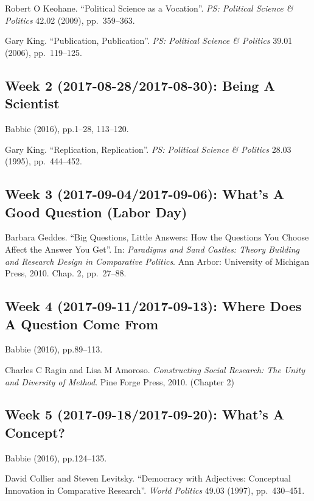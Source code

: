 \documentclass[11pt,]{article}
\theoremstyle{definition}
\theoremstyle{definition}
\theoremstyle{remark}
\begin{document}
Robert O Keohane. ``Political Science as a Vocation''.
\emph{PS: Political Science \& Politics} 42.02 (2009), pp.~359--363.

Gary King. ``Publication, Publication''.
\emph{PS: Political Science \& Politics} 39.01 (2006), pp.~119--125.

\subsection{Week 2 (2017-08-28/2017-08-30): Being A
Scientist}\label{week-2-2017-08-282017-08-30-being-a-scientist}

Babbie (2016), pp.1--28, 113--120.

Gary King. ``Replication, Replication''.
\emph{PS: Political Science \& Politics} 28.03 (1995), pp.~444--452.

\subsection{Week 3 (2017-09-04/2017-09-06): What's A Good Question
(Labor
Day)}\label{week-3-2017-09-042017-09-06-whats-a-good-question-labor-day}

Barbara Geddes. ``Big Questions, Little Answers: How the Questions You
Choose Affect the Answer You Get''. In:
\emph{Paradigms and Sand Castles: Theory Building and Research Design in Comparative Politics}.
Ann Arbor: University of Michigan Press, 2010. Chap. 2, pp.~27--88.

\subsection{Week 4 (2017-09-11/2017-09-13): Where Does A Question Come
From}\label{week-4-2017-09-112017-09-13-where-does-a-question-come-from}

Babbie (2016), pp.89--113.

Charles C Ragin and Lisa M Amoroso.
\emph{Constructing Social Research: The Unity and Diversity of Method}.
Pine Forge Press, 2010. (Chapter 2)

\subsection{Week 5 (2017-09-18/2017-09-20): What's A
Concept?}\label{week-5-2017-09-182017-09-20-whats-a-concept}

Babbie (2016), pp.124--135.

David Collier and Steven Levitsky. ``Democracy with Adjectives:
Conceptual Innovation in Comparative Research''. \emph{World Politics}
49.03 (1997), pp.~430--451.
\end{document}
